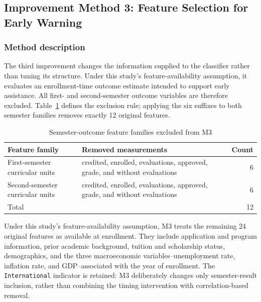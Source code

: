 
\subsection{Improvement Method 3: Feature Selection for Early Warning}
\label{sec:f3}

\subsubsection{Method description}

The third improvement changes the information supplied to the classifier
rather than tuning its structure. Under this study's feature-availability
assumption, it evaluates an enrollment-time outcome estimate intended to support
early assistance. All first- and second-semester outcome variables are therefore
excluded. Table~\ref{tab:f3-exclusions} defines the exclusion rule;
applying the six suffixes to both semester families removes exactly 12 original
features.

\begin{table}[H]
  \centering
  \small
  \caption{Semester-outcome feature families excluded from M3}
  \label{tab:f3-exclusions}
  \begin{tabular}{@{}lp{9.0cm}r@{}}
    \toprule
    Feature family & Removed measurements & Count \\
    \midrule
    First-semester curricular units & credited, enrolled, evaluations,
      approved, grade, and without evaluations & 6 \\
    Second-semester curricular units & credited, enrolled, evaluations,
      approved, grade, and without evaluations & 6 \\
    \midrule
    Total & & 12 \\
    \bottomrule
  \end{tabular}
\end{table}

Under this study's feature-availability assumption, M3 treats the remaining 24
original features as available at enrollment. They include application and
program information, prior academic background, tuition and scholarship status,
demographics, and the three macroeconomic variables--unemployment rate,
inflation rate, and GDP--associated with the year of enrollment. The
\texttt{International} indicator is retained: M3 deliberately changes only
semester-result inclusion, rather than combining the timing intervention
with correlation-based removal.

